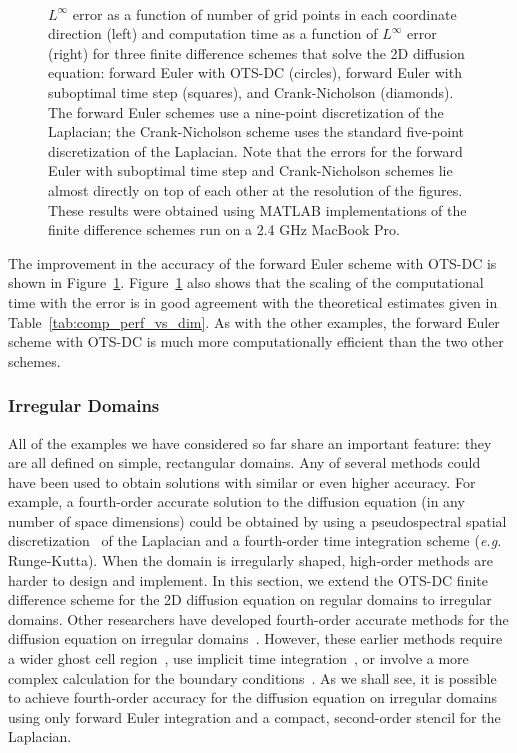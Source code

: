 \documentclass[fleqn,12pt,twoside]{article}
\def\eg{\emph{e.g. }}
\begin{document}
\begin{figure}[tb]
\begin{center}
\ \ 
\caption{$L^\infty$ error as a function of number of grid points in
each coordinate direction (left) and computation time as a function of 
$L^\infty$ error (right) for three finite difference schemes that solve the 
2D diffusion equation:
forward Euler with OTS-DC (circles), forward 
Euler with suboptimal time step (squares), and Crank-Nicholson (diamonds).  
The forward Euler schemes use a nine-point discretization of the Laplacian;
the Crank-Nicholson scheme uses the standard five-point discretization of
the Laplacian.  
Note that the errors for the forward Euler with suboptimal time step and 
Crank-Nicholson schemes lie almost directly on top of each other at the 
resolution of the figures.  
These results were obtained using MATLAB implementations of the 
finite difference schemes run on a 2.4 GHz MacBook Pro.
}
\label{fig:diffusion_eqn_2d_src_analysis}
\end{center}
\end{figure}
The improvement in the accuracy of the forward Euler scheme with OTS-DC
is shown in Figure~\ref{fig:diffusion_eqn_2d_src_analysis}.
Figure~\ref{fig:diffusion_eqn_2d_src_analysis} also shows that the 
scaling of the computational time with the error is in good agreement with the
theoretical estimates given in Table~\ref{tab:comp_perf_vs_dim}.  As with the
other examples, the forward Euler scheme with OTS-DC is much 
more computationally efficient than the two other schemes.  


\subsubsection{Irregular Domains}
All of the examples we have considered so far share an important feature: they 
are all defined on simple, rectangular domains.  Any of several methods 
could have been used to obtain solutions with similar or even higher accuracy.
For example, a fourth-order accurate solution to the diffusion equation
(in any number of space dimensions) could be obtained by using a 
pseudospectral spatial 
discretization~\cite{trefethen_spectral_book,boyd_spectral_book} 
of the Laplacian and a fourth-order time integration scheme 
(\eg Runge-Kutta).  When the domain is irregularly shaped, high-order methods 
are harder to design and implement.  
In this section, we extend the OTS-DC finite difference scheme for the 2D 
diffusion equation on regular domains to irregular domains.  Other 
researchers have developed fourth-order accurate methods for the diffusion 
equation on irregular domains~\cite{gibou_2005,ito_2005}.  However, these 
earlier methods require a wider ghost cell region~\cite{gibou_2005}, use
implicit time integration~\cite{gibou_2005,ito_2005}, or involve a more 
complex calculation for the boundary conditions~\cite{ito_2005}.  As we shall 
see, it is possible to achieve fourth-order accuracy for the diffusion 
equation on irregular domains using only forward Euler integration and a 
compact, second-order stencil for the Laplacian.
\end{document}
